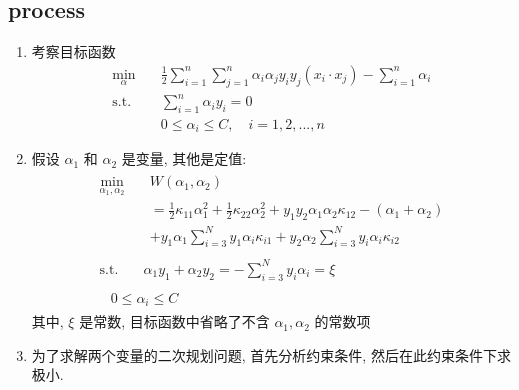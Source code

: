 \documentclass[oneside, 12pt]{ctexbook}
\begin{document}
			\subsection{\quad process}
				\begin{enumerate}
					\item 考察目标函数
						\begin{align}
							\min\limits_{\alpha} \quad & \frac{1}{2}\sum_{i=1}^{n}\sum_{j=1}^{n} \alpha_i\alpha_j y_i y_j (x_i \cdot x_j) - \sum_{i=1}^{n}\alpha_i \\
							\text{s.t.} \quad &\sum_{i=1}^{n} \alpha_i y_i = 0\\
							&0 \leq \alpha_i \leq C, \quad i=1,2,...,n
						\end{align}

					\item 假设 $\alpha_1$ 和 $\alpha_2$ 是变量, 其他是定值:
						\begin{align}
							\begin{split}
								\min\limits_{\alpha_1, \alpha_2} \quad &W(\alpha_1, \alpha_2)\\
									&=\frac{1}{2} \kappa_{11} \alpha_1^2 + \frac{1}{2}\kappa_{22} \alpha_2^2 + y_1 y_2 \alpha_1 \alpha_2 \kappa_{12} - (\alpha_1 + \alpha_2) \\ 
									&+ y_1 \alpha_1 \sum_{i=3}^{N}y_1 \alpha_i \kappa_{i1} + y_2\alpha_2\sum_{i=3}^{N}y_i\alpha_i\kappa_{i2}
							\end{split} \label{target_function_smo}
									\\
							\begin{split}
								\text{s.t.} \quad &\alpha_1 y_1 + \alpha_2 y_2 = - \sum_{i=3}^{N}y_i\alpha_i = \xi
							\end{split} \label{equal_alpha_restrict_smo}
							\\
							\begin{split}
								&0 \leq \alpha_i \leq C
							\end{split} \label{not_equal_alpha_restrict_smo}			
						\end{align}
						其中, $\xi$ 是常数, 目标函数中省略了不含 $\alpha_1, \alpha_2$ 的常数项
						
					\item 为了求解两个变量的二次规划问题, 首先分析约束条件, 然后在此约束条件下求极小. 
						

\end{enumerate}
\end{document}
